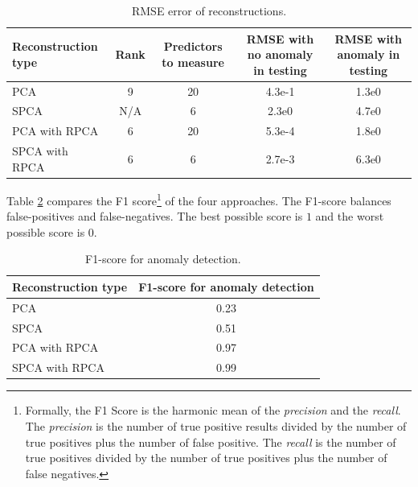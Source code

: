 \documentclass[conference]{IEEEtran}
\begin{document}
\begin{table}[h!]
    \begin{center}
      \caption{RMSE error of reconstructions.}
      \label{tab:table1}
      \begin{tabular}{l|c|c|c|c} %
        \textbf{Reconstruction type} & Rank & \begin{minipage}{0.42in}\textbf{Predictors to measure}\end{minipage}  & \begin{minipage}{0.50in}\textbf{RMSE with no anomaly in testing}\end{minipage} & \begin{minipage}{0.50in}\textbf{RMSE with anomaly in testing}\end{minipage}\\
        \hline
        PCA & 9 & 20 & 4.3e-1 & 1.3e0\\
        SPCA &N/A & 6 & 2.3e0 & 4.7e0 \\
        PCA with RPCA & 6 & 20 & 5.3e-4 & 1.8e0  \\
        SPCA with RPCA & 6 & 6 & 2.7e-3 & 6.3e0 \\
      \end{tabular}
    \end{center}
\end{table}
\noindent
Table \ref{tab:table2} compares the F1 score\footnote{Formally, the F1 Score is the harmonic mean of the \emph{precision} and the \emph{recall}.  The  \emph{precision} is  the number of true positive results divided by the number of true positives plus the number of false positive. The \emph{recall} is the number of true positives divided by the number of true positives plus the number of false negatives.} of the four approaches.  The F1-score balances false-positives and false-negatives.  The best possible score is $1$ and the worst possible score is $0$.
\begin{table}[h!]
    \begin{center}
      \caption{F1-score for anomaly detection. }
      \label{tab:table2}
      \begin{tabular}{l|c} %
        \textbf{Reconstruction type} & \begin{minipage}{1in}\textbf{F1-score for anomaly detection}\end{minipage}\\
        \hline
        PCA &  0.23 \\
        SPCA &  0.51 \\
        PCA with RPCA &  0.97 \\
        SPCA with RPCA &  0.99 \\
      \end{tabular}
    \end{center}
\end{table}
\end{document}
